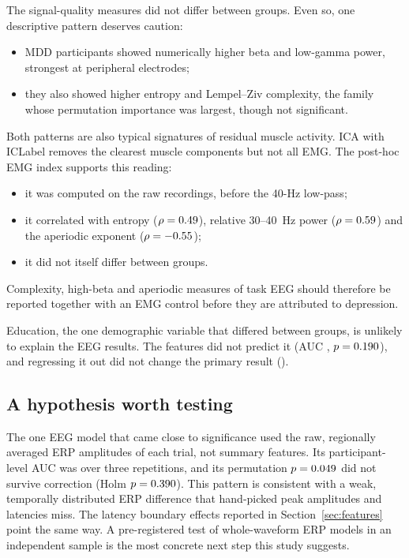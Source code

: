 The signal-quality measures did not differ between groups. Even so, one descriptive pattern deserves caution:
\begin{itemize}
  \item MDD participants showed numerically higher beta and low-gamma power, strongest at peripheral electrodes;
  \item they also showed higher entropy and Lempel--Ziv complexity, the family whose permutation importance was
        largest, though not significant.
\end{itemize}
Both patterns are also typical signatures of residual muscle activity. ICA with ICLabel removes the clearest muscle
components but not all EMG. The post-hoc EMG index supports this reading:
\begin{itemize}
  \item it was computed on the raw recordings, before the 40-Hz low-pass;
  \item it correlated with entropy ($\rho=0.49$), relative 30--40~Hz power ($\rho=0.59$) and the
        aperiodic exponent ($\rho=-0.55$);
  \item it did not itself differ between groups.
\end{itemize}
Complexity, high-beta and aperiodic measures of task EEG should therefore be reported together with an EMG control
before they are attributed to depression.

Education, the one demographic variable that differed between groups, is unlikely to explain the EEG results. The
features did not predict it (AUC \AudEduAuc, $p=0.190$), and regressing it out did not change the primary result
(\AudEEGAlldeconfoundedAuc).

\subsection{A hypothesis worth testing}
The one EEG model that came close to significance used the raw, regionally averaged ERP amplitudes of each trial,
not summary features. Its participant-level AUC was \InflRawamplitudeRfSubjectSplitSubjectAuc{} over three
repetitions, and its permutation $p=0.049$ did not survive correction (Holm $p=0.390$). This pattern
is consistent with a weak, temporally distributed ERP difference that hand-picked peak amplitudes and latencies
miss. The latency boundary effects reported in Section~\ref{sec:features} point the same way. A pre-registered test
of whole-waveform ERP models in an independent sample is the most concrete next step this study suggests.

